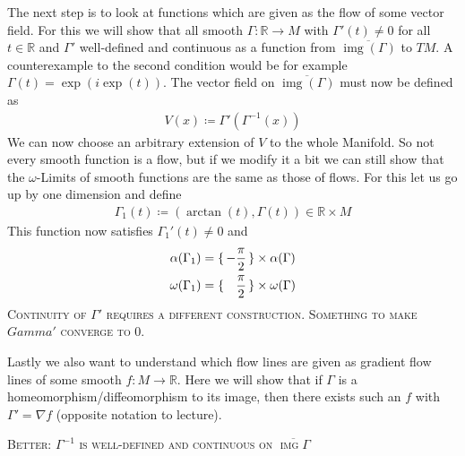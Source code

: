 \documentclass{article}
\DeclareMathOperator{\img}{img}
\begin{document}
	The next step is to look at functions which are given as the flow of some vector field.
	For this we will show that all smooth $\Gamma: \mathbb R \to M$
	with $\Gamma'(t) \neq 0$ for all $t \in \mathbb R$ and $\Gamma'$ well-defined
	and continuous as a function from $\overline{\img(\Gamma)}$ to $TM$. A counterexample
	to the second condition would be for example $\Gamma(t) = \exp(i\exp(t))$.
	The vector field on $\overline{\img(\Gamma)}$ must now be defined as
	\begin{align*}
		V(x) \coloneq \Gamma'(\Gamma^{-1}(x))
	\end{align*}
	We can now choose an arbitrary extension of $V$ to the whole Manifold.
	So not every smooth function is a flow, but if we modify it a bit
	we can still show that the $\omega$-Limits of smooth functions
	are the same as those of flows. For this let us go up by one dimension and define
	\begin{align*}
		\Gamma_1(t) \coloneq (\arctan(t), \Gamma(t)) \in \mathbb R \times M
	\end{align*}
	This function now satisfies $\Gamma_1'(t) \neq 0$ and
	\begin{align*}
		\alpha(\Gamma_1) &= \set{-\frac \pi 2} \times \alpha(\Gamma)		\\
		\omega(\Gamma_1) &= \set{\phantom -\frac \pi 2} \times \omega(\Gamma)  	\\
	\end{align*}
	\textsc{Continuity of $\Gamma'$ requires a different construction. Something to make
	$Gamma'$ converge to $0$.}
	
	Lastly we also want to understand which flow lines are given as
	gradient flow lines of some smooth $f: M \to \mathbb R$. Here
	we will show that if $\Gamma$ is a homeomorphism/diffeomorphism to
	its image, then there exists such an $f$ with $\Gamma' = \nabla f$
	(opposite notation to lecture). 
	
	\textsc{Better: $\Gamma^{-1}$ is well-defined and continuous on $\overline{\img{\Gamma}}$} 
\end{document}
